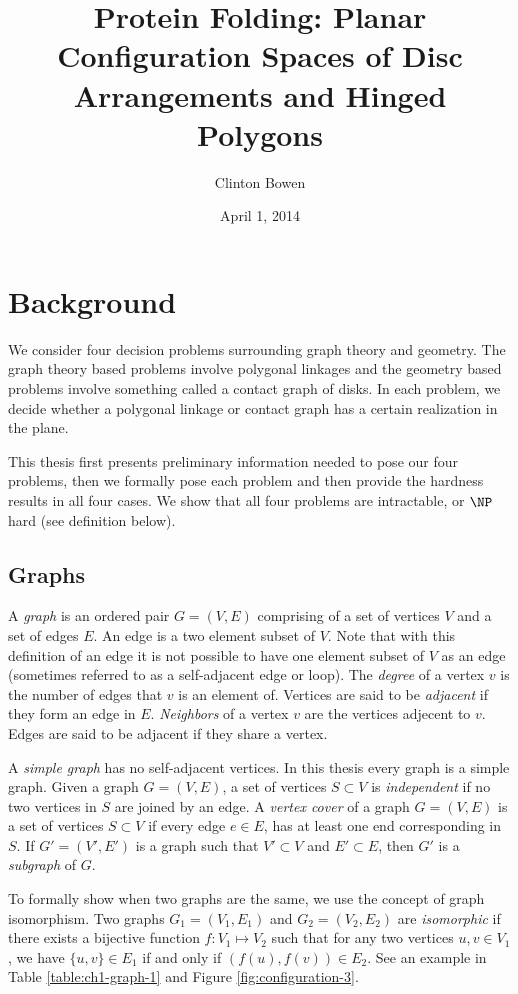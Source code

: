 \documentclass[10pt]{CSUNthesis}
\author{Clinton Bowen}
\title{Protein Folding: Planar Configuration Spaces of Disc Arrangements and
Hinged Polygons}
\date{April 1, 2014}
\theoremstyle{plain}%
\theoremstyle{definition}
\theoremstyle{remark}
\begin{document}
\chapter{Background}

We consider four decision problems surrounding graph theory and geometry. 
The graph theory based problems involve polygonal linkages and the geometry based problems involve something called a contact graph of disks.  
In each problem, we decide whether a polygonal linkage or contact graph has a certain realization in the plane.

This thesis first presents preliminary information needed to pose our four problems, then we formally pose each problem and then provide the hardness results in all four cases.
We show that all four problems are intractable, or $\NP$ hard (see definition below). 
\section{Graphs}
A \textit{graph} is an ordered pair $G = (V,E)$ comprising of a set of vertices $V$ and a set of edges $E$.  
An edge is a two element subset of $V$.
Note that with this definition of an edge it is not possible to have one element subset of $V$ as an edge (sometimes referred to as a self-adjacent edge or loop).
The \textit{degree} of a vertex $v$ is the number of edges that $v$ is an element of.   
Vertices are said to be \textit{adjacent} if they form an edge in $E$.  
\textit{Neighbors} of a vertex $v$ are the vertices adjecent to $v$.  
Edges are said to be adjacent if they share a vertex.  

A \textit{simple graph} has no self-adjacent vertices.
In this thesis every graph is a simple graph.
Given a graph $G = (V,E)$, a set of vertices $S \subset V$ is \textit{independent} if no two vertices in $S$ are joined by an edge. 
A \textit{vertex cover} of a graph $G = (V,E)$  is a set of vertices $S \subset V$ if every edge $e \in E$, has at least one end corresponding in $S$.
If $G' = (V',E')$ is a graph such that $V' \subset V$ and $E' \subset E$, then $G'$ is a \textit{subgraph} of $G$.

To formally show when two graphs are the same, we use the concept of graph isomorphism.
Two graphs $G_1 =(V_1,E_1)$ and $G_2 = (V_2,E_2) $ are \textit{isomorphic} if there exists a bijective function $f: V_1 \mapsto V_2$ such that for any two vertices $u,v \in V_1$, we have $\{u, v\} \in E_1$ if and only if $(f(u),f(v)) \in E_2$. 
See an example in Table \ref{table:ch1-graph-1} and Figure \ref{fig:configuration-3}.
\end{document}
